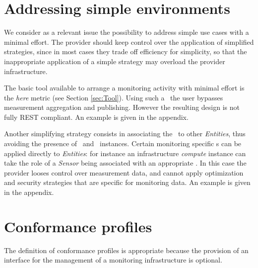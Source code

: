 \documentclass[10pt]{article}  %
\begin{document}

\section{Addressing simple environments \label{simple}}

We consider as a relevant issue the possibility to address simple use cases with a minimal effort. The provider should keep control over the application of simplified strategies, since in most cases they trade off efficiency for simplicity, so that the inappropriate application of a simple strategy may overload the provider infrastructure.

The basic tool available to arrange a monitoring activity with minimal effort is the {\em here} metric \mi (see Section \ref{sec:Tool}). Using such a \mi\ the user bypasses measurement aggregation and publishing. However the resulting design is not fully REST compliant. An example is given in the appendix.

Another simplifying strategy consists in associating the \mi\ to other {\em Entities}, thus avoiding the presence of \sens\ and \coll\ instances. Certain monitoring specific \mi s can be applied directly to {\em Entities}: for instance an infrastructure {\em compute} instance can take the role of a {\em Sensor} being associated with an appropriate \mi . In this case the provider looses control over measurement data, and cannot apply optimization and security strategies that are specific for monitoring data. An example is given in the appendix.

\section{Conformance profiles}

The definition of conformance profiles is appropriate because the provision of an interface for the management of a monitoring infrastructure is optional. 
\end{document}
